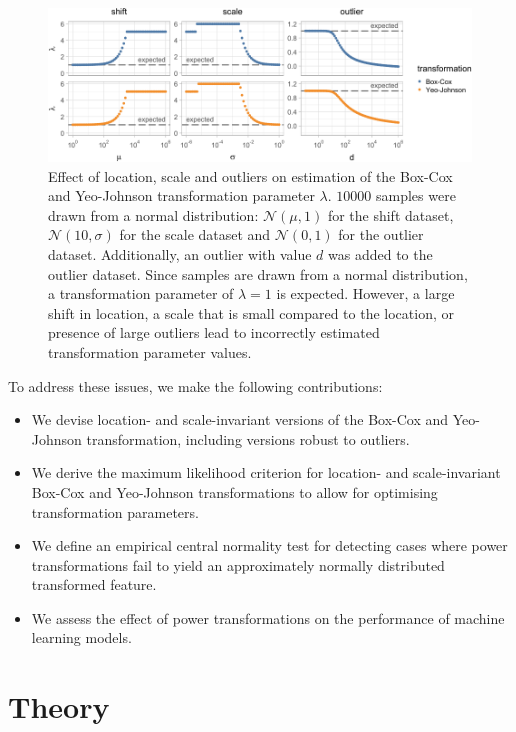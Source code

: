 \documentclass[preprint,12pt,authoryear]{elsarticle}
\begin{document}
\begin{figure}

{\centering \includegraphics{figure_1} 

}

\caption{Effect of location, scale and outliers on estimation of the Box-Cox and Yeo-Johnson transformation parameter $\lambda$. $10000$ samples were drawn from a normal distribution: $\mathcal{N}(\mu, 1)$ for the shift dataset, $\mathcal{N}(10, \sigma)$ for the scale dataset and $\mathcal{N}(0, 1)$ for the outlier dataset. Additionally, an outlier with value $d$ was added to the outlier dataset. Since samples are drawn from a normal distribution, a transformation parameter of $\lambda = 1$ is expected. However, a large shift in location, a scale that is small compared to the location, or presence of large outliers lead to incorrectly estimated transformation parameter values.}\label{fig:decreased-normality}
\end{figure}

To address these issues, we make the following contributions:

\begin{itemize}
\item
  We devise location- and scale-invariant versions of the Box-Cox and
  Yeo-Johnson transformation, including versions robust to outliers.
\item
  We derive the maximum likelihood criterion for location- and
  scale-invariant Box-Cox and Yeo-Johnson transformations to allow for
  optimising transformation parameters.
\item
  We define an empirical central normality test for detecting cases
  where power transformations fail to yield an approximately normally
  distributed transformed feature.
\item
  We assess the effect of power transformations on the performance of
  machine learning models.
\end{itemize}

\section{Theory}\label{theory}
\end{document}
